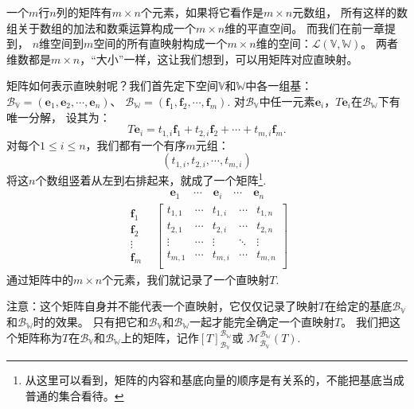 \documentclass[12pt,UTF8]{ctexbook}
\begin{document}
一个$m$行$n$列的矩阵有$m\times n$个元素，如果将它看作是$m\times n$元数组，
所有这样的数组关于数组的加法和数乘运算构成一个$m\times n$维的平直空间。
而我们在前一章提到，
$n$维空间到$m$空间的所有直映射构成一个$m\times n$维的空间：$\mathcal{L}(\mathbb{V},\mathbb{W})$。
两者维数都是$m\times n$，“大小”一样，这让我们想到，可以用矩阵对应直映射。

矩阵如何表示直映射呢？我们首先定下空间$\mathbb{V}$和$\mathbb{W}$中各一组基：
$\mathcal{B}_{\mathbb{V}} = (\mathbf{e}_1, \mathbf{e}_2, \cdots, \mathbf{e}_n)$、
$\mathcal{B}_{\mathbb{W}} = (\mathbf{f}_1, \mathbf{f}_2, \cdots, \mathbf{f}_m)$.
对$\mathcal{B}_{\mathbb{V}}$中任一元素$\mathbf{e}_i$，$T\mathbf{e}_i$在$\mathcal{B}_{\mathbb{W}}$下有唯一分解，
设其为：
$$ T\mathbf{e}_i = t_{1,i}\mathbf{f}_1 + t_{2,i}\mathbf{f}_2 + \cdots + t_{m,i}\mathbf{f}_m.$$
对每个$1\leq i \leq n$，我们都有一个有序$m$元组：
$$ (t_{1,i}, t_{2,i}, \cdots, t_{m,i}) $$ 
将这$n$个数组竖着从左到右排起来，就成了一个矩阵\footnote{从这里可以看到，矩阵的内容和基底向量的顺序是有关系的，不能把基底当成普通的集合看待。}.
\begin{align*}
  \quad  & \quad \,\, \mathbf{e}_1 \quad \, \cdots \quad \mathbf{e}_i \quad \cdots \quad  \mathbf{e}_n  \\
\begin{matrix} \mathbf{f}_1 \\ \mathbf{f}_2 \\ \vdots \\ \mathbf{f}_m \end{matrix} & \left[
\begin{matrix}
 t_{1,1}     & \cdots & t_{1,i}   & \cdots & t_{1,n} \\
 t_{2,1}     & \cdots & t_{2,i}   & \cdots & t_{2,n} \\
 \vdots      & \cdots & \vdots    & \ddots & \vdots  \\
 t_{m,1}     & \cdots & t_{m,i}   & \cdots & t_{m,n} \\
\end{matrix}
\right]   
\end{align*}
通过矩阵中的$m\times n$个元素，我们就记录了一个直映射$T$.

注意：这个矩阵自身并不能代表一个直映射，它仅仅记录了映射$T$在给定的基底$\mathcal{B}_{\mathbb{V}}$和$\mathcal{B}_{\mathbb{W}}$时的效果。
只有把它和$\mathcal{B}_{\mathbb{V}}$和$\mathcal{B}_{\mathbb{W}}$一起才能完全确定一个直映射$T$。
我们把这个矩阵称为$T$在$\mathcal{B}_{\mathbb{V}}$和$\mathcal{B}_{\mathbb{W}}$上的矩阵，记作$[T]_{\mathcal{B}_{\mathbb{V}}}^{\mathcal{B}_{\mathbb{W}}}$或
$\mathcal{M}_{\mathcal{B}_{\mathbb{V}}}^{\mathcal{B}_{\mathbb{W}}}(T).$
\end{document}

